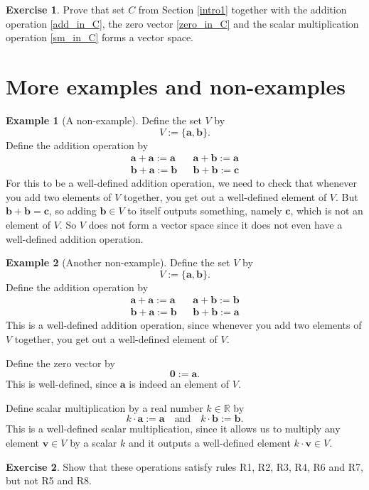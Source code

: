 \documentclass[a4paper,11pt]{book}
\theoremstyle{definition}
\newtheorem{exercise}{Exercise}
\newtheorem{example_environment}{Example}[chapter]
\newcommand{\be}{\begin{equation}}
\newcommand{\ee}{\end{equation}}
\newcommand{\ve}[1]{\mathbf{#1}}
\newenvironment{example}
	{
		\begin{oframed} 
		\begin{example_environment}
	}
	{
		\end{example_environment}
		\end{oframed}
	}
\begin{document}
\begin{exercise} Prove that set $C$ from Section \ref{intro1} together with the addition operation \eqref{add_in_C}, the zero vector \eqref{zero_in_C} and the scalar multiplication operation \eqref{sm_in_C} forms a vector space.
\end{exercise}




\section{More examples and non-examples} \label{Ch1Sec4MoreExamples}

\begin{example}[A non-example] Define the set $V$ by 
\be
 V := \{ \mathbf{a}, \mathbf{b} \} .
\ee
Define the addition operation by 
\begin{align}
 \ve{a} + \ve{a} := \ve{a} && \ve{a} + \ve{b} := \ve{a} \\
 \ve{b} + \ve{a} := \ve{b} && \ve{b} + \ve{b} := \ve{c} 
\end{align}
For this to be a well-defined addition operation, we need to check that whenever you add two elements of $V$ together, you get out a well-defined element of $V$. But $\ve{b} + \ve{b} = \ve{c}$, so adding $\ve{b} \in V$ to itself outputs something, namely $\ve{c}$, which is not an element of $V$. So $V$ does not form a vector space since it does not even have a well-defined addition operation.
\end{example}

\begin{example}[Another non-example] Define the set $V$ by 
\be
 V := \{ \mathbf{a}, \mathbf{b} \} .
\ee
Define the addition operation by 
\begin{align}
 \ve{a} + \ve{a} := \ve{a} && \ve{a} + \ve{b} := \ve{b} \label{ne_11} \\
 \ve{b} + \ve{a} := \ve{b} && \ve{b} + \ve{b} := \ve{a} \label{ne_12}
\end{align}
This is a well-defined addition operation, since whenever you add two elements of $V$ together, you get out a well-defined element of $V$.

Define the zero vector by 
\be
 \ve{0} := \ve{a}. \label{ne_13}
\ee
This is well-defined, since $\ve{a}$ is indeed an element of $V$.

Define scalar multiplication by a real number $k \in \mathbb{R}$ by
\be
 k \cdot \ve{a} := \ve{a} \quad \mbox{and} \quad k \cdot \ve{b} := \ve{b}. \label{ne_14}
\ee
This is a well-defined scalar multiplication, since it allows us to multiply any element $\ve{v} \in V$ by a scalar $k$ and it outputs a well-defined element $k \cdot \ve{v} \in V$. 
\begin{exercise} Show that these operations satisfy rules R1, R2, R3, R4, R6 and R7, but not R5 and R8.
\end{exercise}
\end{example}
\end{document}
